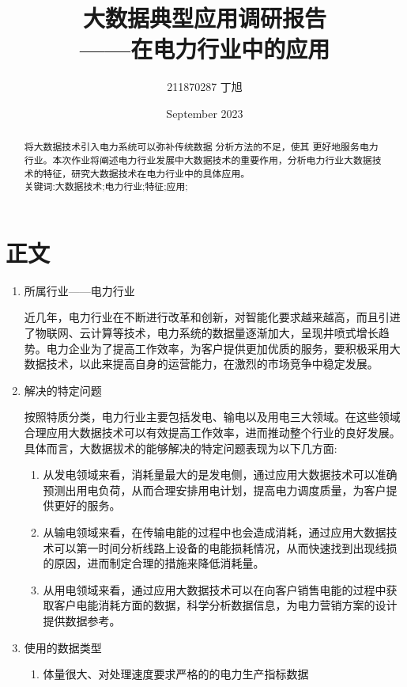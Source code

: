 \documentclass{article}
\title{大数据典型应用调研报告\\ \small{——在电力行业中的应用}}
\author{211870287 丁旭 }
\date{September 2023}
\begin{document}
\maketitle

\begin{abstract}
将大数据技术引入电力系统可以弥补传统数据 分析方法的不足，使其 更好地服务电力行业。本次作业将阐述电力行业发展中大数据技术的重要作用，分析电力行业大数据技术的特征，研究大数据技术在电力行业中的具体应用。\\
关键词:大数据技术;电力行业;特征;应用;
\end{abstract}


\section*{正文}

\begin{enumerate}
  \item 所属行业——电力行业\par 近几年，电力行业在不断进行改革和创新，对智能化要求越来越高，而且引进了物联网、云计算等技术，电力系统的数据量逐渐加大，呈现井喷式增长趋势。电力企业为了提高工作效率，为客户提供更加优质的服务，要积极采用大数据技术，以此来提高自身的运营能力，在激烈的市场竞争中稳定发展。
  \item 解决的特定问题\par
  按照特质分类，电力行业主要包括发电、输电以及用电三大领域。在这些领域合理应用大数据技术可以有效提高工作效率，进而推动整个行业的良好发展。具体而言，大数据拔术的能够解决的特定问题表现为以下几方面:
  \begin{enumerate}
      \item 从发电领域来看，消耗量最大的是发电侧，通过应用大数据技术可以准确预测出用电负荷，从而合理安排用电计划，提高电力调度质量，为客户提供更好的服务。
      \item 从输电领域来看，在传输电能的过程中也会造成消耗，通过应用大数据技术可以第一时间分析线路上设备的电能损耗情况，从而快速找到出现线损的原因，进而制定合理的措施来降低消耗量。 
      \item 从用电领域来看，通过应用大数据技术可以在向客户销售电能的过程中获取客户电能消耗方面的数据，科学分析数据信息，为电力营销方案的设计提供数据参考。 
  \end{enumerate}
  \item 使用的数据类型\par
      \begin{enumerate}
          \item 体量很大、对处理速度要求严格的的电力生产指标数据\par

\end{enumerate}
\end{enumerate}
\end{document}
